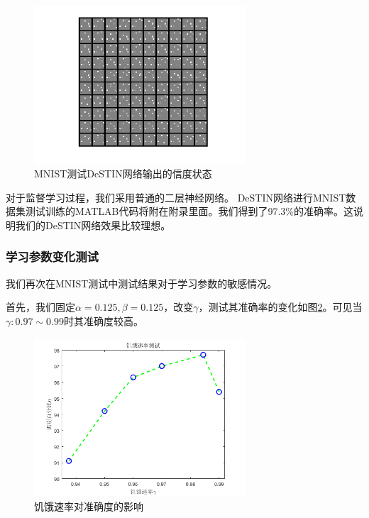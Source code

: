 \begin{figure}[htbp]
   \centering
   \includegraphics[width=0.7\textwidth]{MNISTResult.png} %
   \caption{MNIST测试DeSTIN网络输出的信度状态}
   \label{fig:belief}
\end{figure}

对于监督学习过程，我们采用普通的二层神经网络。 DeSTIN网络进行MNIST数据集测试训练的MATLAB代码将附在附录里面。我们得到了97.3\%的准确率。这说明我们的DeSTIN网络效果比较理想。

\subsubsection{学习参数变化测试}
我们再次在MNIST测试中测试结果对于学习参数的敏感情况。

首先，我们固定$\alpha = 0.125, \beta = 0.125$，改变$\gamma$，测试其准确率的变化如图\ref{fig:starverate}。可见当$\gamma:0.97\sim 0.99$时其准确度较高。

\begin{figure}[htbp]
   \centering
   \includegraphics[width=0.7\textwidth]{StarveRate.png} %
   \caption{饥饿速率对准确度的影响}
   \label{fig:starverate}
\end{figure}

